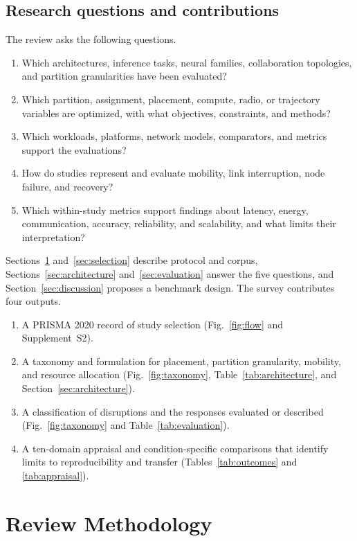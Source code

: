 \documentclass[journal]{IEEEtran}
\begin{document}
\subsection{Research questions and contributions}
The review asks the following questions.
\begin{enumerate}
\item[\textbf{RQ1}] Which architectures, inference tasks, neural families, collaboration topologies, and partition granularities have been evaluated?
\item[\textbf{RQ2}] Which partition, assignment, placement, compute, radio, or trajectory variables are optimized, with what objectives, constraints, and methods?
\item[\textbf{RQ3}] Which workloads, platforms, network models, comparators, and metrics support the evaluations?
\item[\textbf{RQ4}] How do studies represent and evaluate mobility, link interruption, node failure, and recovery?
\item[\textbf{RQ5}] Which within-study metrics support findings about latency, energy, communication, accuracy, reliability, and scalability, and what limits their interpretation?
\end{enumerate}
Sections~\ref{sec:methods} and~\ref{sec:selection} describe protocol and corpus, Sections~\ref{sec:architecture} and~\ref{sec:evaluation} answer the five questions, and Section~\ref{sec:discussion} proposes a benchmark design. The survey contributes four outputs.
\begin{enumerate}
\item A PRISMA 2020 record of study selection (Fig.~\ref{fig:flow} and Supplement~S2).
\item A taxonomy and formulation for placement, partition granularity, mobility, and resource allocation (Fig.~\ref{fig:taxonomy}, Table~\ref{tab:architecture}, and Section~\ref{sec:architecture}).
\item A classification of disruptions and the responses evaluated or described (Fig.~\ref{fig:taxonomy} and Table~\ref{tab:evaluation}).
\item A ten-domain appraisal and condition-specific comparisons that identify limits to reproducibility and transfer (Tables~\ref{tab:outcomes} and \ref{tab:appraisal}).
\end{enumerate}

\section{Review Methodology}\label{sec:methods}
\end{document}
